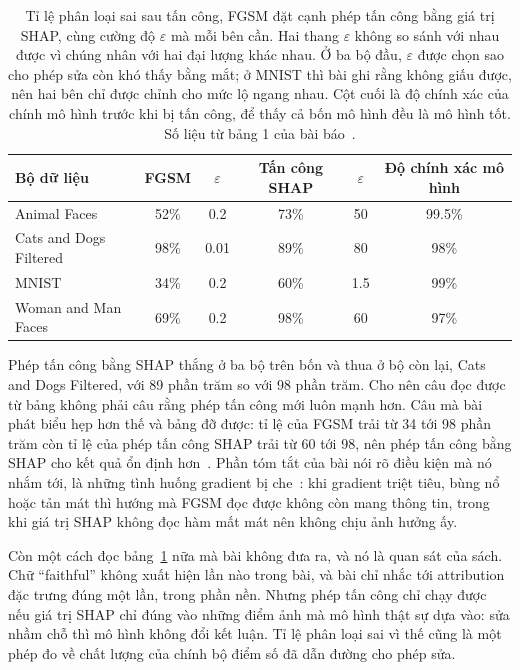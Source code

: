 \begin{table}[htbp]
\centering
\caption{Tỉ lệ phân loại sai sau tấn công, FGSM đặt cạnh phép tấn công bằng giá
trị SHAP, cùng cường độ $\varepsilon$ mà mỗi bên cần. Hai thang $\varepsilon$
không so sánh với nhau được vì chúng nhân với hai đại lượng khác nhau. Ở ba bộ
đầu, $\varepsilon$ được chọn sao cho phép sửa còn khó thấy bằng mắt; ở MNIST
thì bài ghi rằng không giấu được, nên hai bên chỉ được chỉnh cho mức lộ ngang
nhau. Cột cuối là độ chính xác của chính mô hình trước khi bị tấn công, để thấy
cả bốn mô hình đều là mô hình tốt. Số liệu từ bảng 1 của bài
báo~\autocite{p28shapattack}.}
\label{tab:ch14-ti-le-phan-loai-sai}
\begin{tabular}{@{}lccccc@{}}
\toprule
Bộ dữ liệu & FGSM & $\varepsilon$ & Tấn công SHAP & $\varepsilon$ & Độ chính xác mô hình \\
\midrule
Animal Faces & 52\% & 0.2 & 73\% & 50 & 99.5\% \\
Cats and Dogs Filtered & 98\% & 0.01 & 89\% & 80 & 98\% \\
MNIST & 34\% & 0.2 & 60\% & 1.5 & 99\% \\
Woman and Man Faces & 69\% & 0.2 & 98\% & 60 & 97\% \\
\bottomrule
\end{tabular}
\end{table}

Phép tấn công bằng SHAP thắng ở ba bộ trên bốn và thua ở bộ còn lại, Cats and
Dogs Filtered, với 89 phần trăm so với 98 phần trăm. Cho nên câu đọc được từ
bảng không phải câu rằng phép tấn công mới luôn mạnh hơn. Câu mà bài phát biểu
hẹp hơn thế và bảng đỡ được: tỉ lệ của FGSM trải từ 34 tới 98 phần trăm còn tỉ
lệ của phép tấn công SHAP trải từ 60 tới 98, nên phép tấn công bằng SHAP cho
kết quả ổn định hơn~\autocite{p28shapattack}. Phần tóm tắt của bài nói rõ điều
kiện mà nó nhắm tới, là những tình huống gradient bị
che~\autocite{p28shapattack}: khi gradient triệt tiêu, bùng nổ hoặc tản mát thì
hướng mà FGSM đọc được không còn mang thông tin, trong khi giá trị SHAP không
đọc hàm mất mát nên không chịu ảnh hưởng ấy.

%
Còn một cách đọc bảng~\ref{tab:ch14-ti-le-phan-loai-sai} nữa mà bài không đưa
ra, và nó là quan sát của sách. Chữ \enquote{faithful} không xuất hiện lần nào
trong bài, và bài chỉ nhắc tới attribution đặc trưng đúng một lần, trong phần
nền. Nhưng phép tấn công chỉ chạy được nếu giá trị SHAP chỉ đúng vào những điểm
ảnh mà mô hình thật sự dựa vào: sửa nhầm chỗ thì mô hình không đổi kết luận. Tỉ
lệ phân loại sai vì thế cũng là một phép đo về chất lượng của chính bộ điểm số
đã dẫn đường cho phép sửa.


